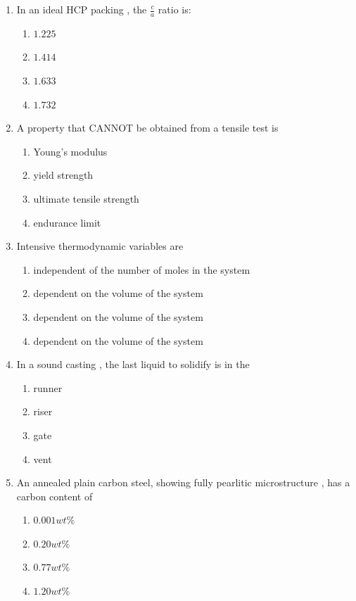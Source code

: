 \documentclass[journal]{IEEEtran}
\theoremstyle{remark}
\begin{document}
\begin{enumerate}
\item  In an ideal HCP packing , the $\frac{c}{a}$ ratio is:\hfill{}

\begin{multicols}{4}
\begin{enumerate}
\item $1.225$
\item $1.414$
\item $1.633$
\item $1.732$
\end{enumerate}
\end{multicols}

\item  A property that CANNOT be obtained from a tensile test is
\hfill{}
\begin{multicols}{2}
\begin{enumerate}
\item Young's modulus
\item yield strength
\item ultimate tensile strength
\item endurance limit
\end{enumerate}
\end{multicols}

\item  Intensive thermodynamic variables are \hfill{}
\begin{enumerate}
\item independent of the number of moles in the system
\item dependent on the volume of the system
\item dependent on the volume of the system
\item dependent on the volume of the system
\end{enumerate}

\item In a sound casting , the last liquid to solidify is in the \hfill{}
\begin{multicols}{4}
\begin{enumerate}
\item runner
\item riser
\item gate
\item vent
\end{enumerate}
\end{multicols}

\item An annealed plain carbon steel, showing fully pearlitic microstructure , has a carbon content of\hfill{}
\begin{multicols}{4}
\begin{enumerate}
\item $0.001wt\%$
\item $0.20wt\%$
\item $0.77wt\%$
\item $1.20wt\%$
\end{enumerate}
\end{multicols}


\end{enumerate}
\end{document}
